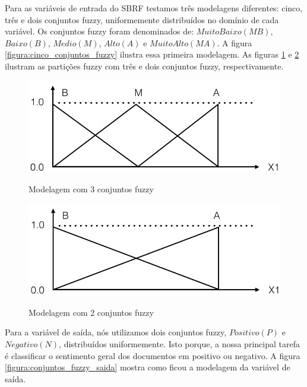 Para as variáveis de entrada do SBRF testamos três modelagens diferentes: cinco, três e dois conjuntos fuzzy, uniformemente distribuídos no domínio de cada variável. Os conjuntos fuzzy foram denominados de: $Muito Baixo (MB)$, $Baixo (B)$, $Medio (M)$, $Alto (A)$ e $Muito Alto (MA)$. A figura \ref{figura:cinco_conjuntos_fuzzy} ilustra essa primeira modelagem. As figuras \ref{figura:tres_conjuntos_fuzzy} e \ref{figura:conjuntos_fuzzy_entrada_final} ilustram as partições fuzzy com três e dois conjuntos fuzzy, respectivamente.

\begin{figure}[H]
\caption{Modelagem com 3 conjuntos fuzzy}
\centering
\includegraphics[scale=0.45]{tres_conjuntos_fuzzy.png}
\label{figura:tres_conjuntos_fuzzy}
\end{figure}

\begin{figure}[H]
\caption{Modelagem com 2 conjuntos fuzzy}
\centering
\includegraphics[scale=0.45]{conjuntos_fuzzy_entrada_final.png}
\label{figura:conjuntos_fuzzy_entrada_final}
\end{figure}


Para a variável de saída, nós utilizamos dois conjuntos fuzzy, $Positivo (P)$ e $Negativo (N)$, distribuídos uniformemente. Isto porque, a nossa principal tarefa é classificar o sentimento geral dos documentos em positivo ou negativo. A figura \ref{figura:conjuntos_fuzzy_saida} mostra como ficou a modelagem da variável de saída.

